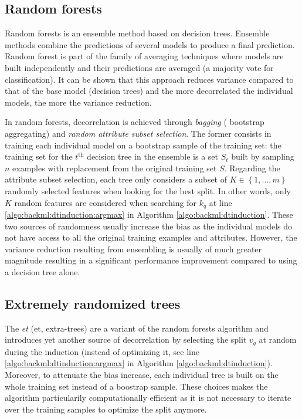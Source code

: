 \subsection{Random forests}
\label{ssec:backml:rf}

Random forests \parencite{breiman2001random} is an ensemble method based on decision
trees. Ensemble methods combine the predictions of several models to produce a
final prediction. Random forest is part of the family of averaging techniques
where models are built independently and their predictions are averaged (\eg a
majority vote for classification). It can be shown that this approach reduces
variance compared to that of the base model (\eg decision trees) and the more
decorrelated the individual models, the more the variance reduction.

In random forests, decorrelation is achieved through \textit{bagging} (\aka
bootstrap aggregating) and \textit{random attribute subset selection}. The former
consists in training each individual model on a bootstrap sample of the training
set: the training set for the $t^{\text{th}}$ decision tree in the ensemble is a
set $S_t$ built by sampling $n$ examples with replacement from the original training
set $S$. Regarding the attribute subset selection, each tree only considers a
subset of $K \in \left\{1,..., m\right\}$ randomly selected features when looking
for the best split. In other words, only $K$ random features are considered when
searching for $k_q$ at line \ref{algo:backml:dtinduction:argmax} in Algorithm
\ref{algo:backml:dtinduction}. These two sources of randomness usually increase
the bias as the individual models do not have access to all the original training
examples and attributes. However, the variance reduction resulting from ensembling
is usually of much greater magnitude resulting in a significant performance
improvement compared to using a decision tree alone.

\subsection{Extremely randomized trees}
\label{ssec:backml:et}

The \textit{\acrlong{et}} (\acrshort{et}, \aka extra-trees) \parencite{geurts2006extremely}
are a variant of the random forests algorithm and introduces yet another source
of decorrelation by selecting the split $v_q$ at random during the induction
(instead of optimizing it, see line \ref{algo:backml:dtinduction:argmax} in
Algorithm \ref{algo:backml:dtinduction}). Moreover, to attenuate the bias increase,
each individual tree is built on the whole training set instead of a boostrap
sample. These choices makes the algorithm particularily computationally efficient
as it is not necessary to iterate over the training samples to optimize the split
anymore.

